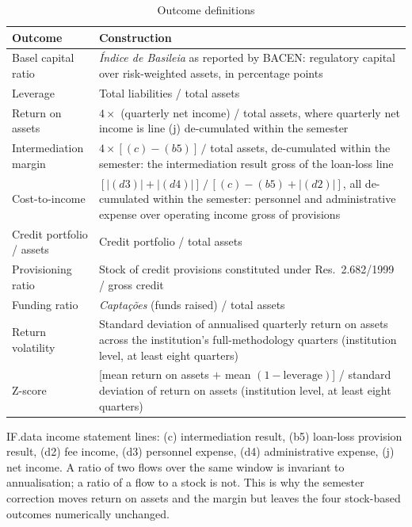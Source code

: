 \documentclass[11pt,a4paper]{article}
\begin{document}
\begin{table}[htbp]
\centering
\small
\caption{Outcome definitions}
\label{tab:defs}
\begin{threeparttable}
\begin{tabular}{lp{10.2cm}}
\toprule
Outcome & Construction \\
\midrule
Basel capital ratio & \textit{Índice de Basileia} as reported by BACEN: regulatory
capital over risk-weighted assets, in percentage points \\
Leverage & Total liabilities / total assets \\
Return on assets & $4 \times$ (quarterly net income) / total assets, where quarterly net
income is line (j) de-cumulated within the semester \\
Intermediation margin & $4 \times [(c) - (b5)]\,/$ total assets, de-cumulated within the
semester: the intermediation result gross of the loan-loss line \\
Cost-to-income & $[|(d3)| + |(d4)|] \,/\, [(c) - (b5) + |(d2)|]$, all de-cumulated within
the semester: personnel and administrative expense over operating income gross of
provisions \\
Credit portfolio / assets & Credit portfolio / total assets \\
Provisioning ratio & Stock of credit provisions constituted under Res.~2.682/1999 /
gross credit \\
Funding ratio & \textit{Captações} (funds raised) / total assets \\
\midrule
Return volatility & Standard deviation of annualised quarterly return on assets across
the institution's full-methodology quarters (institution level, at least eight
quarters) \\
Z-score & [mean return on assets $+$ mean $(1 - \text{leverage})$] / standard deviation
of return on assets (institution level, at least eight quarters) \\
\bottomrule
\end{tabular}
\begin{tablenotes}[flushleft]\footnotesize
\item IF.data income statement lines: (c) intermediation result, (b5) loan-loss
provision result, (d2) fee income, (d3) personnel expense, (d4) administrative expense,
(j) net income. A ratio of two flows over the same window is invariant to annualisation;
a ratio of a flow to a stock is not. This is why the semester correction moves return on
assets and the margin but leaves the four stock-based outcomes numerically unchanged.
\end{tablenotes}
\end{threeparttable}
\end{table}
\end{document}
